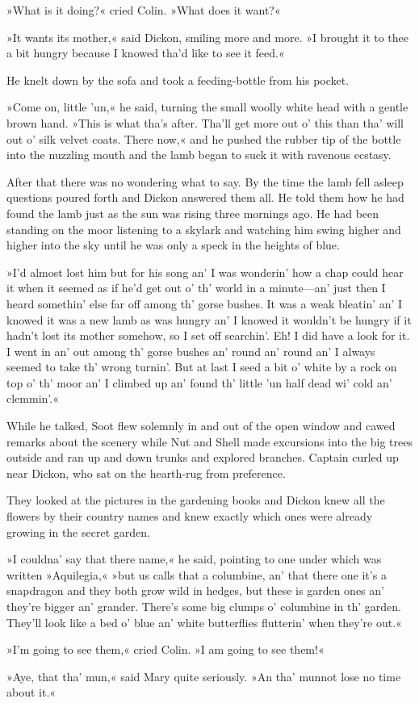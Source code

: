 »What is it doing?« cried Colin. »What does it want?«

»It wants its mother,« said Dickon, smiling more and more. »I brought it to thee a bit hungry because I knowed tha'd like to see it feed.«

He knelt down by the sofa and took a feeding-bottle from his pocket.

»Come on, little 'un,« he said, turning the small woolly white head with a gentle brown hand. »This is what tha's after. Tha'll get more out o' this than tha' will out o' silk velvet coats. There now,« and he pushed the rubber tip of the bottle into the nuzzling mouth and the lamb began to suck it with ravenous ecstasy.

After that there was no wondering what to say. By the time the lamb fell asleep questions poured forth and Dickon answered them all. He told them how he had found the lamb just as the sun was rising three mornings ago. He had been standing on the moor listening to a skylark and watching him swing higher and higher into the sky until he was only a speck in the heights of blue.

»I'd almost lost him but for his song an' I was wonderin' how a chap could hear it when it seemed as if he'd get out o' th' world in a minute—an' just then I heard somethin' else far off among th' gorse bushes. It was a weak bleatin' an' I knowed it was a new lamb as was hungry an' I knowed it wouldn't be hungry if it hadn't lost its mother somehow, so I set off searchin'. Eh! I did have a look for it. I went in an' out among th' gorse bushes an' round an' round an' I always seemed to take th' wrong turnin'. But at last I seed a bit o' white by a rock on top o' th' moor an' I climbed up an' found th' little 'un half dead wi' cold an' clemmin'.«

While he talked, Soot flew solemnly in and out of the open window and cawed remarks about the scenery while Nut and Shell made excursions into the big trees outside and ran up and down trunks and explored branches. Captain curled up near Dickon, who sat on the hearth-rug from preference.

They looked at the pictures in the gardening books and Dickon knew all the flowers by their country names and knew exactly which ones were already growing in the secret garden.

»I couldna' say that there name,« he said, pointing to one under which was written »Aquilegia,« »but us calls that a columbine, an' that there one it's a snapdragon and they both grow wild in hedges, but these is garden ones an' they're bigger an' grander. There's some big clumps o' columbine in th' garden. They'll look like a bed o' blue an' white butterflies flutterin' when they're out.«

»I'm going to see them,« cried Colin. »I am going to see them!«

»Aye, that tha' mun,« said Mary quite seriously. »An tha' munnot lose no time about it.«